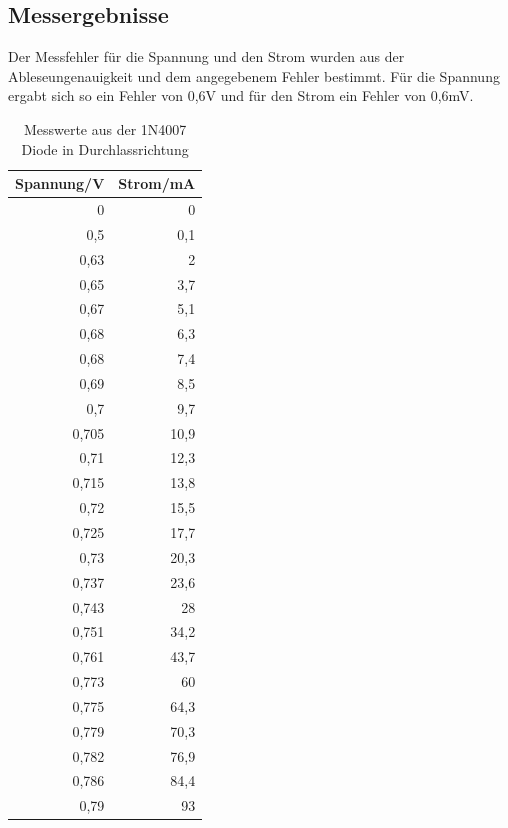 \documentclass[12pt,a4paper]{article}
\begin{document}
\subsection{Messergebnisse}

Der Messfehler für die Spannung und den Strom wurden aus der Ableseungenauigkeit und dem angegebenem Fehler bestimmt. Für die Spannung ergabt sich so ein Fehler von 0,6V und für den Strom ein Fehler von 0,6mV.

\begin{table}[H]
\centering
\caption{Messwerte aus der 1N4007 Diode in Durchlassrichtung}
\begin{tabular}{|r|r|}
\hline
\multicolumn{1}{|l|}{Spannung/V} & \multicolumn{1}{l|}{Strom/mA} \\ \hline
0 & 0 \\ \hline
0,5 & 0,1 \\ \hline
0,63 & 2 \\ \hline
0,65 & 3,7 \\ \hline
0,67 & 5,1 \\ \hline
0,68 & 6,3 \\ \hline
0,68 & 7,4 \\ \hline
0,69 & 8,5 \\ \hline
0,7 & 9,7 \\ \hline
0,705 & 10,9 \\ \hline
0,71 & 12,3 \\ \hline
0,715 & 13,8 \\ \hline
0,72 & 15,5 \\ \hline
0,725 & 17,7 \\ \hline
0,73 & 20,3 \\ \hline
0,737 & 23,6 \\ \hline
0,743 & 28 \\ \hline
0,751 & 34,2 \\ \hline
0,761 & 43,7 \\ \hline
0,773 & 60 \\ \hline
0,775 & 64,3 \\ \hline
0,779 & 70,3 \\ \hline
0,782 & 76,9 \\ \hline
0,786 & 84,4 \\ \hline
0,79 & 93 \\ \hline
\end{tabular}
\label{tab:a1_1}
\end{table}
\end{document}
